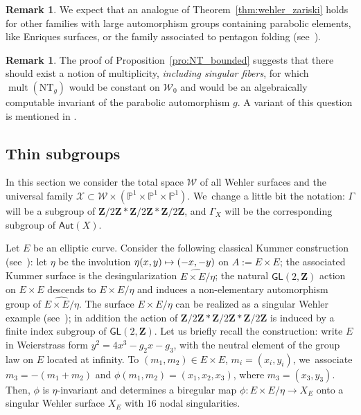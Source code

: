 \documentclass[11pt]{article}
\newcommand\mto{\mathchoice{\longmapsto}{\mapsto}{\mapsto}{\mapsto}}
\newcommand{\pu}{{\mathbb{P}^1}}
\DeclareMathOperator{\mult}{mult}
\def\Z{\mathbf{Z}}
\newcommand{\cW}{\mathcal{W}}
\newcommand{\NT}{{\mathrm{NT}}}
\newcommand\Aut{\mathsf{Aut}}
\newcommand\GL{{\mathsf{GL}}}
\theoremstyle{plain}
\theoremstyle{definition}
\newtheorem{rem}[thm]{Remark}
\numberwithin{equation}{section}
\begin{document}
\begin{rem}
We expect that an analogue of Theorem~\ref{thm:wehler_zariski} holds for other families
with large automorphism groups containing parabolic elements, like Enriques surfaces, or the family associated to pentagon folding (see~\cite{Simons}).
\end{rem}

\begin{rem}
The proof of Proposition~\ref{pro:NT_bounded} suggests that
there should exist a notion of multiplicity, {\textit{including singular fibers}},
for which $\mult(\NT_g)$ would be constant on $\cW_0$ and would be an algebraically
computable invariant of the parabolic automorphism $g$. A variant of this question is mentioned in \cite[Rem.\,7.7.4]{duistermaat}.
\end{rem}

\subsection{Thin subgroups}\label{subs:thin}
In this section we consider the total
space $ \cW$ of all Wehler surfaces and the universal family
$\mathcal X\subset \cW\times (\pu\times \pu\times \pu)$. We~change a
little bit the notation: $\Gamma$ will be a subgroup of $\Z/2\Z\ast\Z/2\Z\ast\Z/2\Z$, and
$\Gamma_{X}$ will be the corresponding subgroup of $\Aut(X)$.

Let $E$ be an elliptic curve. Consider the following classical Kummer construction (see~\cite[\S 4]{finite_orbits}): let $\eta$ be
the involution $\eta (x,y)\mto (-x,-y)$ on $A:=E\times E$; the associated Kummer surface is
the desingularization $\widehat{E\times E/\eta}$; the natural $\GL(2, \Z)$ action on $E\times E$ descends
to $E\times E/\eta$ and
induces a non-elementary automorphism group of $\widehat{E\times E/\eta}$.
The surface $E\times E/\eta$ can be realized as a singular Wehler example
(see~\cite[\S 8.2]{Cantat:Panorama-Synthese}); in addition the action of
$\Z/2\Z\ast\Z/2\Z\ast\Z/2\Z$ is induced by a finite index subgroup of $\GL(2, \Z)$.
Let us briefly recall the construction: write
$E$ in Weierstrass form $y^2 = 4x^3 - g_2x - g_3$, with the neutral element of the group law on
$E$ located at infinity.
To $(m_1, m_2)\in E\times E$, $m_i = (x_i, y_i)$, we~associate $m_3 = - (m_1+m_2)$ and
$\phi(m_1, m_2 ) = (x_1, x_2, x_3)$, where $m_3 = (x_3, y_3)$. Then, $\phi$ is $\eta$-invariant and determines
a biregular map
$\phi: E\times E/\eta\to X_E$ onto a singular Wehler surface $X_E$ with $16$ nodal singularities.
\end{document}
